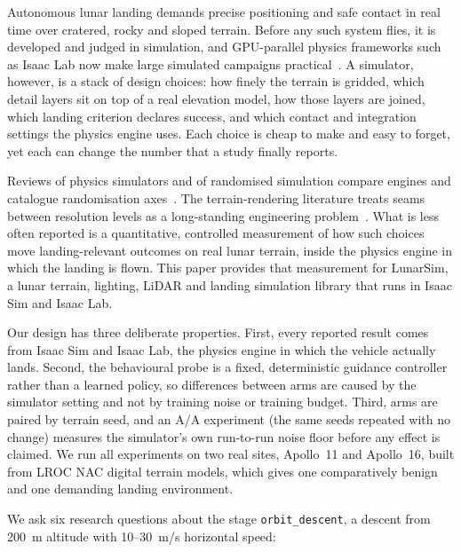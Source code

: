 Autonomous lunar landing demands precise positioning and safe contact in real time over cratered, rocky and sloped terrain. Before any such system flies, it is developed and judged in simulation, and GPU-parallel physics frameworks such as Isaac Lab now make large simulated campaigns practical~\cite{mittal2023,nvidia2025,rudin2022}. A simulator, however, is a stack of design choices: how finely the terrain is gridded, which detail layers sit on top of a real elevation model, how those layers are joined, which landing criterion declares success, and which contact and integration settings the physics engine uses. Each choice is cheap to make and easy to forget, yet each can change the number that a study finally reports.

Reviews of physics simulators and of randomised simulation compare engines and catalogue randomisation axes~\cite{collins2021,muratore2022}. The terrain-rendering literature treats seams between resolution levels as a long-standing engineering problem~\cite{losasso2004,duchaineau1997,deboer2000,pajarola2007}. What is less often reported is a quantitative, controlled measurement of how such choices move landing-relevant outcomes on real lunar terrain, inside the physics engine in which the landing is flown. This paper provides that measurement for LunarSim, a lunar terrain, lighting, LiDAR and landing simulation library that runs in Isaac Sim and Isaac Lab.

Our design has three deliberate properties. First, every reported result comes from Isaac Sim and Isaac Lab, the physics engine in which the vehicle actually lands. Second, the behavioural probe is a fixed, deterministic guidance controller rather than a learned policy, so differences between arms are caused by the simulator setting and not by training noise or training budget. Third, arms are paired by terrain seed, and an A/A experiment (the same seeds repeated with no change) measures the simulator's own run-to-run noise floor before any effect is claimed. We run all experiments on two real sites, Apollo~11 and Apollo~16, built from LROC NAC digital terrain models, which gives one comparatively benign and one demanding landing environment.

We ask six research questions about the stage \texttt{orbit\_descent}, a descent from 200~m altitude with 10--30~m/s horizontal speed:

